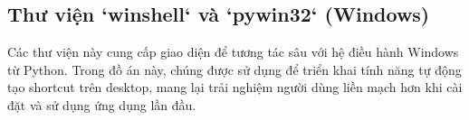 \subsection{Thư viện `winshell` và `pywin32` (Windows)}
Các thư viện này cung cấp giao diện để tương tác sâu với hệ điều hành Windows từ Python. Trong đồ án này, chúng được sử dụng để triển khai tính năng tự động tạo shortcut trên desktop, mang lại trải nghiệm người dùng liền mạch hơn khi cài đặt và sử dụng ứng dụng lần đầu.
\newpage